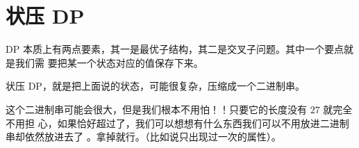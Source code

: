 \section{状压 DP}\label{sec:状压 DP}
DP 本质上有两点要素，其一是最优子结构，其二是交叉子问题。其中一个要点就是我们需
要把某一个状态对应的值保存下来。

状压 DP，就是把上面说的状态，可能很复杂，压缩成一个二进制串。

这个二进制串可能会很大，但是我们根本不用怕！！只要它的长度没有 $27$ 就完全不用担
心，如果恰好超过了，我们可以想想有什么东西我们可以不用放进二进制串却依然放进去了
。拿掉就行。（比如说只出现过一次的属性）。
